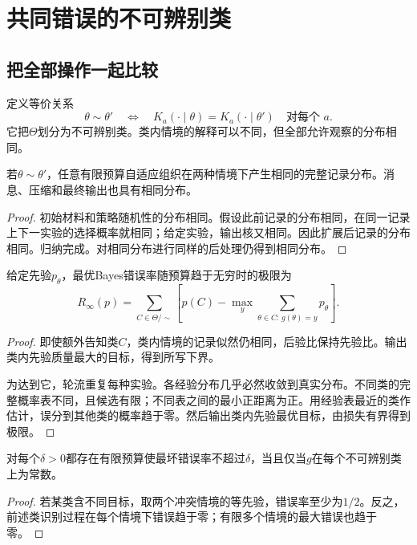 \chapter{共同错误的不可辨别类}
\label{ch:identifiability}

\section{把全部操作一起比较}
定义等价关系
\[
 \theta\sim\theta'\quad\Longleftrightarrow\quad
 K_a(\cdot\mid\theta)=K_a(\cdot\mid\theta')\quad\text{对每个 }a.
\]
它把$\Theta$划分为不可辨别类。类内情境的解释可以不同，但全部允许观察的分布相同。

\begin{theorem}[任意组织的不变盲点]
\label{thm:blind}
若$\theta\sim\theta'$，任意有限预算自适应组织在两种情境下产生相同的完整记录分布。消息、压缩和最终输出也具有相同分布。
\end{theorem}
\begin{proof}
初始材料和策略随机性的分布相同。假设此前记录的分布相同，在同一记录上下一实验的选择概率就相同；给定实验，输出核又相同。因此扩展后记录的分布相同。归纳完成。对相同分布进行同样的后处理仍得到相同分布。
\end{proof}

\begin{theorem}[不可辨别类的精确渐近误差]
\label{thm:floor}
给定先验$p_\theta$，最优Bayes错误率随预算趋于无穷时的极限为
\[
 R_\infty(p)=\sum_{C\in\Theta/{\sim}}
 \left[p(C)-\max_y\sum_{\theta\in C:\,g(\theta)=y}p_\theta\right].
\]
\end{theorem}
\begin{proof}
即使额外告知类$C$，类内情境的记录似然仍相同，后验比保持先验比。输出类内先验质量最大的目标，得到所写下界。

为达到它，轮流重复每种实验。各经验分布几乎必然收敛到真实分布。不同类的完整概率表不同，且候选有限；不同表之间的最小正距离为正。用经验表最近的类作估计，误分到其他类的概率趋于零。然后输出类内先验最优目标，由损失有界得到极限。
\end{proof}

\begin{corollary}[目标可辨别性的充要条件]
\label{cor:identifiability}
对每个$\delta>0$都存在有限预算使最坏错误率不超过$\delta$，当且仅当$g$在每个不可辨别类上为常数。
\end{corollary}
\begin{proof}
若某类含不同目标，取两个冲突情境的等先验，错误率至少为$1/2$。反之，前述类识别过程在每个情境下错误趋于零；有限多个情境的最大错误也趋于零。
\end{proof}

